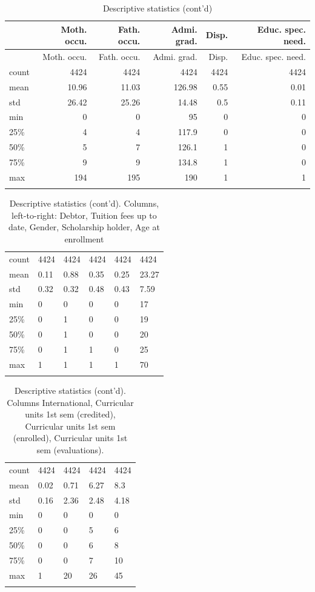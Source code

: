 \documentclass[
  letterpaper,
  DIV=11,
  numbers=noendperiod]{scrartcl}
\begin{document}
\hypertarget{tbl-descstat-3}{}
\begin{longtable}[]{@{}lrrrrr@{}}
\toprule\noalign{}
& Moth. occu. & Fath. occu. & Admi. grad. & Disp. & Educ. spec. need. \\
\midrule\noalign{}
\endfirsthead
\toprule\noalign{}
& Moth. occu. & Fath. occu. & Admi. grad. & Disp. & Educ. spec. need. \\
\midrule\noalign{}
\endhead
\bottomrule\noalign{}
\endlastfoot
count & 4424 & 4424 & 4424 & 4424 & 4424 \\
mean & 10.96 & 11.03 & 126.98 & 0.55 & 0.01 \\
std & 26.42 & 25.26 & 14.48 & 0.5 & 0.11 \\
min & 0 & 0 & 95 & 0 & 0 \\
25\% & 4 & 4 & 117.9 & 0 & 0 \\
50\% & 5 & 7 & 126.1 & 1 & 0 \\
75\% & 9 & 9 & 134.8 & 1 & 0 \\
max & 194 & 195 & 190 & 1 & 1 \\
\caption{\label{tbl-descstat-3}Descriptive statistics
(cont'd)}\tabularnewline
\end{longtable}

\hypertarget{tbl-descstat-4}{}
\begin{longtable}[]{@{}llllll@{}}
\toprule\noalign{}
\endfirsthead
\endhead
\bottomrule\noalign{}
\endlastfoot
count & 4424 & 4424 & 4424 & 4424 & 4424 \\
mean & 0.11 & 0.88 & 0.35 & 0.25 & 23.27 \\
std & 0.32 & 0.32 & 0.48 & 0.43 & 7.59 \\
min & 0 & 0 & 0 & 0 & 17 \\
25\% & 0 & 1 & 0 & 0 & 19 \\
50\% & 0 & 1 & 0 & 0 & 20 \\
75\% & 0 & 1 & 1 & 0 & 25 \\
max & 1 & 1 & 1 & 1 & 70 \\
\caption{\label{tbl-descstat-4}Descriptive statistics (cont'd). Columns,
left-to-right: Debtor, Tuition fees up to date, Gender, Scholarship
holder, Age at enrollment}\tabularnewline
\end{longtable}

\hypertarget{tbl-descstat-5}{}
\begin{longtable}[]{@{}lllll@{}}
\toprule\noalign{}
\endfirsthead
\endhead
\bottomrule\noalign{}
\endlastfoot
count & 4424 & 4424 & 4424 & 4424 \\
mean & 0.02 & 0.71 & 6.27 & 8.3 \\
std & 0.16 & 2.36 & 2.48 & 4.18 \\
min & 0 & 0 & 0 & 0 \\
25\% & 0 & 0 & 5 & 6 \\
50\% & 0 & 0 & 6 & 8 \\
75\% & 0 & 0 & 7 & 10 \\
max & 1 & 20 & 26 & 45 \\
\caption{\label{tbl-descstat-5}Descriptive statistics (cont'd). Columns
International, Curricular units 1st sem (credited), Curricular units 1st
sem (enrolled), Curricular units 1st sem (evaluations).}\tabularnewline
\end{longtable}
\end{document}

